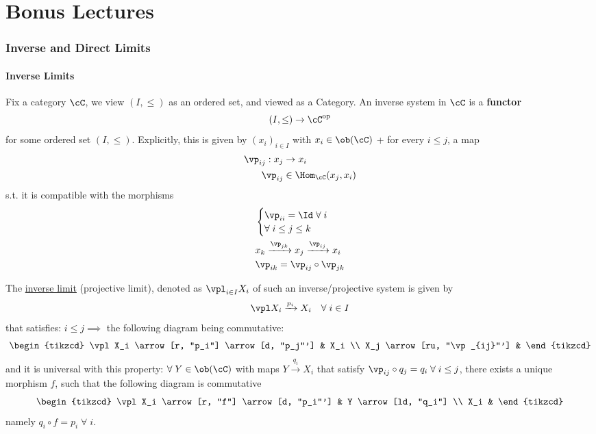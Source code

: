 \part{Bonus Lectures}

\section{Inverse and Direct Limits}

\subsection{Inverse Limits}

\begin{definition}
	Fix a category \( \cC \), we view \( (I, \leq) \) as an ordered set, and viewed as a Category. An
	inverse system in \( \cC \) is a \textbf{functor}
	\[
		(I,\leq) \to \cC^{\text{op}}
	\]
	for some ordered set \( (I,\leq) \). Explicitly, this is given by \( (x_i)_{i\in I} \) with \( x_i
	\in \ob(\cC)\) + for every \( i\leq j \), a map
	\[
		\begin{aligned}
			\vp_{ij}: x_j & \to x_i                 \\
			\vp_{ij}      & \in \Hom_{\cC}(x_j,x_i)
		\end{aligned}
	\]
	s.t. it is compatible with the morphisms
	\[
		\begin{aligned}
			 &
			\begin{cases}
				\vp_{ii} = \Id \; \forall \; i \\
				\forall \; i \leq j \leq k
			\end{cases}                                \\
			 & x_k \xrightarrow{\vp_{jk}}  x_j \xrightarrow{\vp_{ij}} x_i \\
			 & \vp_{ik} = \vp_{ij}\circ \vp_{jk}
		\end{aligned}
	\]
\end{definition}

\begin{definition}
	The \underline{inverse limit} (projective limit), denoted as \( \vpl_{i\in I} X_i \) of such an
	inverse/projective system is given by
	\[
		\vpl X_i \xrightarrow{p_i} X_i \quad \forall \; i \in I
	\]
	that satisfies: \( i\leq j \implies \) the following diagram being commutative:
	\[
		\begin{tikzcd}
			\vpl X_i \arrow[r, "p_i"] \arrow[d, "p_j"'] & X_i \\
			X_j \arrow[ru, "\vp_{ij}"'] &
		\end{tikzcd}
	\]
	and it is universal with this property: \( \forall \; Y \in \ob(\cC) \) with maps \( Y
	\xrightarrow{q_i} X_i \) that satisfy \( \vp_{ij}\circ q_j = q_i \; \forall \; i \leq j \), there
	exists a unique morphism \( f \), such that the following diagram is commutative
	\[
		\begin{tikzcd}
			\vpl X_i \arrow[r, "f"] \arrow[d, "p_i"'] & Y \arrow[ld, "q_i"] \\
			X_i &
		\end{tikzcd}
	\]
	namely \( q_i \circ f = p_i \; \forall \; i\).
\end{definition}

